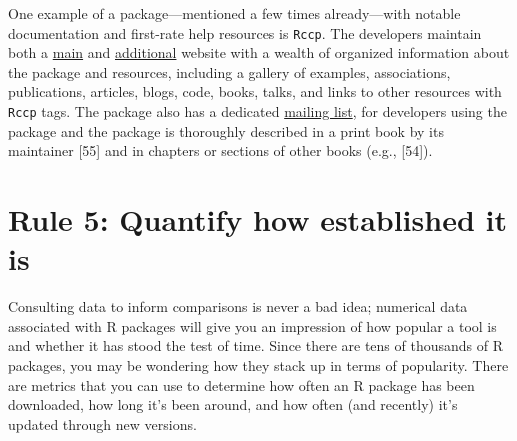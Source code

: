 \documentclass[10pt,letterpaper]{article}
\begin{document}
One example of a package---mentioned a few times already---with notable
documentation and first-rate help resources is \texttt{Rccp}. The
developers maintain both a \href{http://www.rcpp.org/}{main} and
\href{http://dirk.eddelbuettel.com/code/rcpp.html}{additional} website
with a wealth of organized information about the package and resources,
including a gallery of examples, associations, publications, articles,
blogs, code, books, talks, and links to other resources with
\texttt{Rccp} tags. The package also has a dedicated
\href{https://lists.r-forge.r-project.org/cgi-bin/mailman/listinfo/rcpp-devel}{mailing
list}, for developers using the package and the package is thoroughly
described in a print book by its maintainer {[}55{]} and in chapters or
sections of other books (e.g., {[}54{]}).

\hypertarget{rule-5-quantify-how-established-it-is}{%
\section{Rule 5: Quantify how established it
is}\label{rule-5-quantify-how-established-it-is}}

Consulting data to inform comparisons is never a bad idea; numerical
data associated with R packages will give you an impression of how
popular a tool is and whether it has stood the test of time. Since there
are tens of thousands of R packages, you may be wondering how they stack
up in terms of popularity. There are metrics that you can use to
determine how often an R package has been downloaded, how long it's been
around, and how often (and recently) it's updated through new versions.
\end{document}
